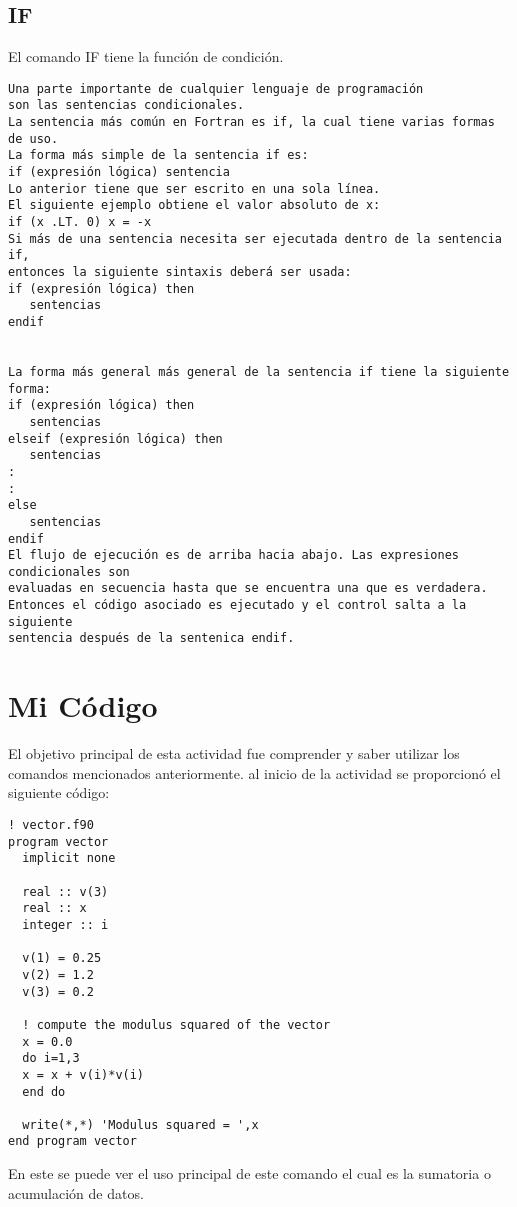 \documentclass{article}
\begin{document}
\subsection{IF}
El comando IF tiene la función de condición.
\begin{verbatim}
Una parte importante de cualquier lenguaje de programación 
son las sentencias condicionales. 
La sentencia más común en Fortran es if, la cual tiene varias formas de uso.
La forma más simple de la sentencia if es:
if (expresión lógica) sentencia
Lo anterior tiene que ser escrito en una sola línea. 
El siguiente ejemplo obtiene el valor absoluto de x:
if (x .LT. 0) x = -x
Si más de una sentencia necesita ser ejecutada dentro de la sentencia if,
entonces la siguiente sintaxis deberá ser usada:
if (expresión lógica) then
   sentencias
endif


La forma más general más general de la sentencia if tiene la siguiente forma:
if (expresión lógica) then
   sentencias
elseif (expresión lógica) then
   sentencias
:
:
else
   sentencias
endif
El flujo de ejecución es de arriba hacia abajo. Las expresiones condicionales son
evaluadas en secuencia hasta que se encuentra una que es verdadera.
Entonces el código asociado es ejecutado y el control salta a la siguiente 
sentencia después de la sentenica endif.

\end{verbatim}

\section{Mi Código}
El objetivo principal de esta actividad fue comprender y saber utilizar los comandos mencionados anteriormente.
al inicio de la actividad se proporcionó el siguiente código:
\begin{verbatim}
! vector.f90
program vector
  implicit none
 
  real :: v(3)
  real :: x
  integer :: i
 
  v(1) = 0.25
  v(2) = 1.2
  v(3) = 0.2
 
  ! compute the modulus squared of the vector
  x = 0.0
  do i=1,3
  x = x + v(i)*v(i)
  end do
 
  write(*,*) 'Modulus squared = ',x
end program vector
\end{verbatim}

En este se puede ver el uso principal de este comando el cual es la sumatoria o acumulación de datos.
\end{document}
